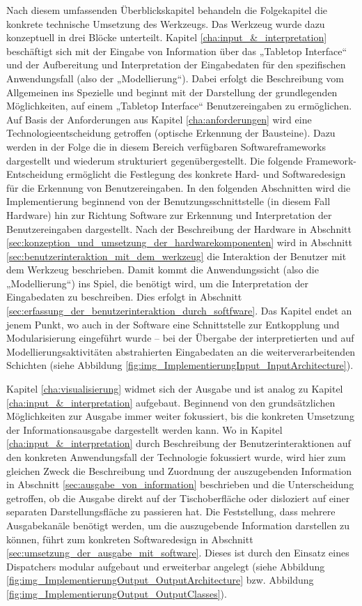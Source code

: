 Nach diesem umfassenden Überblickskapitel behandeln die Folgekapitel die konkrete technische Umsetzung des Werkzeugs. Das Werkzeug wurde dazu konzeptuell in drei Blöcke unterteilt. Kapitel \ref{cha:input_&_interpretation} beschäftigt sich mit der Eingabe von Information über das „Tabletop Interface“ und der Aufbereitung und Interpretation der Eingabedaten für den spezifischen Anwendungsfall (also der „Modellierung“). Dabei erfolgt die Beschreibung vom Allgemeinen ins Spezielle und beginnt mit der Darstellung der grundlegenden Möglichkeiten, auf einem „Tabletop Interface“ Benutzereingaben zu ermöglichen. Auf Basis der Anforderungen aus Kapitel \ref{cha:anforderungen} wird eine Technologieentscheidung getroffen (optische Erkennung der Bausteine). Dazu werden in der Folge die in diesem Bereich verfügbaren Softwareframeworks dargestellt und wiederum strukturiert gegenübergestellt. Die folgende Framework-Entscheidung ermöglicht die Festlegung des konkrete Hard- und Softwaredesign für die Erkennung von Benutzereingaben. In den folgenden Abschnitten wird die Implementierung beginnend von der Benutzungsschnittstelle (in diesem Fall Hardware) hin zur Richtung Software zur Erkennung und Interpretation der Benutzereingaben dargestellt. Nach der Beschreibung der Hardware in Abschnitt \ref{sec:konzeption_und_umsetzung_der_hardwarekomponenten} wird in Abschnitt \ref{sec:benutzerinteraktion_mit_dem_werkzeug} die Interaktion der Benutzer mit dem Werkzeug beschrieben. Damit kommt die Anwendungssicht (also die „Modellierung“) ins Spiel, die benötigt wird, um die Interpretation der Eingabedaten zu beschreiben. Dies erfolgt in Abschnitt \ref{sec:erfassung_der_benutzerinteraktion_durch_softfware}. Das Kapitel endet an jenem Punkt, wo auch in der Software eine Schnittstelle zur Entkopplung und Modularisierung eingeführt wurde -- bei der Übergabe der interpretierten und auf Modellierungsaktivitäten abstrahierten Eingabedaten an die weiterverarbeitenden Schichten (siehe Abbildung \ref{fig:img_ImplementierungInput_InputArchitecture}).

Kapitel \ref{cha:visualisierung} widmet sich der Ausgabe und ist analog zu Kapitel \ref{cha:input_&_interpretation} aufgebaut. Beginnend von den grundsätzlichen Möglichkeiten zur Ausgabe immer weiter fokussiert, bis die konkreten Umsetzung der Informationsausgabe dargestellt werden kann. Wo in Kapitel \ref{cha:input_&_interpretation} durch Beschreibung der Benutzerinteraktionen auf den konkreten Anwendungsfall der Technologie fokussiert wurde, wird hier zum gleichen Zweck die Beschreibung und Zuordnung der auszugebenden Information in Abschnitt \ref{sec:ausgabe_von_information} beschrieben und die Unterscheidung getroffen, ob die Ausgabe direkt auf der Tischoberfläche oder disloziert auf einer separaten Darstellungsfläche zu passieren hat. Die Feststellung, dass mehrere Ausgabekanäle benötigt werden, um die auszugebende Information darstellen zu können, führt zum konkreten Softwaredesign in Abschnitt \ref{sec:umsetzung_der_ausgabe_mit_software}. Dieses ist durch den Einsatz eines Dispatchers modular aufgebaut und erweiterbar angelegt (siehe Abbildung \ref{fig:img_ImplementierungOutput_OutputArchitecture} bzw. Abbildung \ref{fig:img_ImplementierungOutput_OutputClasses}).

